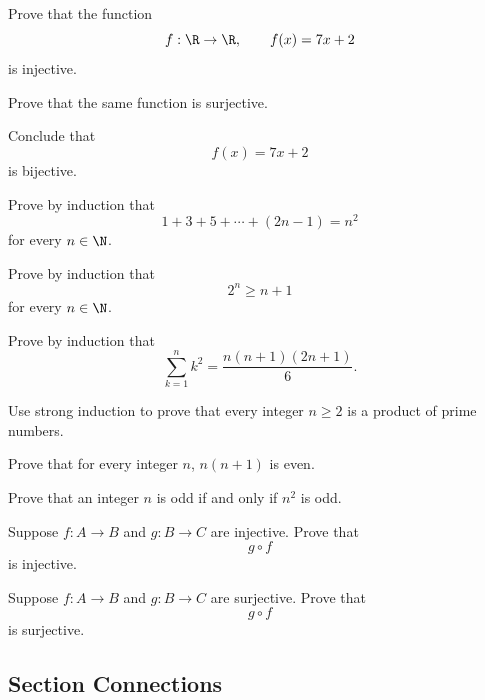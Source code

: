 \begin{exercise}[2]
Prove that the function
\[ f:\R\to\R,\qquad f(x)=7x+2 \]
is injective.
\end{exercise}

\begin{exercise}[2]
Prove that the same function is surjective.
\end{exercise}

\begin{exercise}[2]
Conclude that
\[ f(x)=7x+2 \]
is bijective.
\end{exercise}

\begin{exercise}[2]
Prove by induction that
\[ 1+3+5+\cdots+(2n-1)=n^2 \]
for every \(n\in\N\).
\end{exercise}

\begin{exercise}[2]
Prove by induction that
\[ 2^n\geq n+1 \]
for every \(n\in\N\).
\end{exercise}

\begin{exercise}[3]
Prove by induction that
\[ \sum_{k=1}^{n}k^2=\frac{n(n+1)(2n+1)}6. \]
\end{exercise}

\begin{exercise}[3]
Use strong induction to prove that every integer \(n\geq2\) is a product of
prime numbers.
\end{exercise}

\begin{exercise}[2]
Prove that for every integer \(n\), \(n(n+1)\) is even.
\end{exercise}

\begin{exercise}[3]
Prove that an integer \(n\) is odd if and only if \(n^2\) is odd.
\end{exercise}

\begin{exercise}[3]
Suppose \(f:A\to B\) and \(g:B\to C\) are injective. Prove that
\[ g\circ f \]
is injective.
\end{exercise}

\begin{exercise}[3]
Suppose \(f:A\to B\) and \(g:B\to C\) are surjective. Prove that
\[ g\circ f \]
is surjective.
\end{exercise}

\subsection{Section Connections}
\label{subsec:proof-connections}

